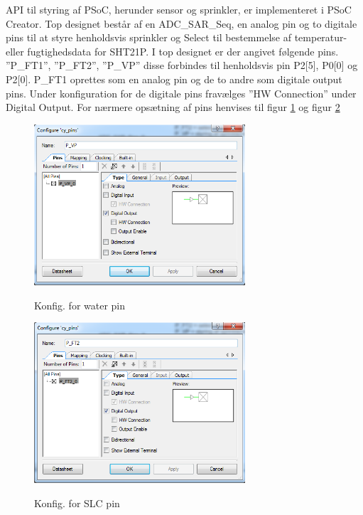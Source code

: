 
API til styring af PSoC, herunder sensor og sprinkler, er implementeret i PSoC Creator. Top designet består af en ADC\_SAR\_Seq, en analog pin og to digitale pins til at styre henholdsvis sprinkler og Select til bestemmelse af temperatur- eller fugtighedsdata for SHT21P.
I top designet er der angivet følgende pins. ''P\_FT1'', ''P\_FT2'', ''P\_VP'' disse forbindes til henholdsvis pin P2[5], P0[0] og P2[0]. P\_FT1 oprettes som en analog pin og de to andre som digitale output pins. Under konfiguration for de digitale pins fravælges ''HW Connection'' under Digital Output. For nærmere opsætning af pins henvises til figur \ref{lab:P_PV_config} og figur \ref{lab:P_FT2_config}

\begin{figure}[htb]
\centering
{\includegraphics[width=0.70\textwidth]{filer/pics/P_PV_config.png}}
\caption{Konfig. for water pin}
\label{lab:P_PV_config}
\end{figure}


\begin{figure}[htb]
\centering
{\includegraphics[width=0.70\textwidth]{filer/pics/P_FT2_config.png}}
\caption{Konfig. for SLC pin}
\label{lab:P_FT2_config}
\end{figure}  

